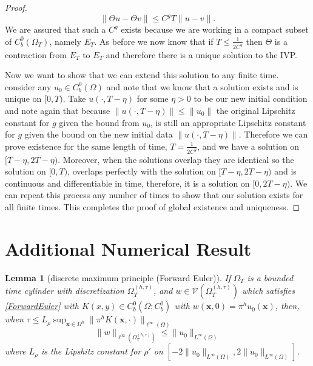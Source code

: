 \documentclass[aps,
preprint,
groupedaddress,
showkeys,
amsmath]{revtex4-2}
\newtheorem{lemma}{Lemma}
\begin{document}
\begin{proof}
       \[\|\Theta u-\Theta v\|\leq C^gT\|u-v\|.\] We are assured that such a $C^g$ exists because we are working in a compact subset of $C^0_b(\Omega_T)$, namely $E_T$.
        As before we now know that if $T\leq \frac{1}{2C^g}$ then $\Theta$ is a contraction from $E_{T}$ to $E_T$ and therefore there is a unique solution to the IVP.

        Now we want to show that we can extend this solution to any finite time. 
        consider any $u_0\in C^0_b(\Omega)$ and note that we know that a solution exists and is unique on $[0,T)$. Take $u(\cdot, T-\eta)$ for some $\eta>0$ to be our new initial condition and note again that because $\|u(\cdot, T-\eta)\|\leq \|u_0\|$ the original Lipschitz constant for $g$ given the bound from $u_0$, is still an appropriate Lipschitz constant for $g$ given the bound on the new initial data $\|u(\cdot,T-\eta)\|$. Therefore we can prove existence for the same length of time, $T=\frac{1}{2C^g}$, and we have a solution on $[T-\eta, 2T-\eta)$. Moreover, when the solutions overlap they are identical so the solution on $[0,T)$, overlaps perfectly with the solution on $[T-\eta, 2T-\eta)$ and is continuous and differentiable in time, therefore, it is a solution on $[0,2T-\eta)$. We can repeat this process any number of times to show that our solution exists for all finite times. This completes the proof of global existence and uniqueness. 
    \end{proof}

\section{Additional Numerical Result}\label{APP:AdditionalNumericalResults}
    \begin{lemma}[discrete maximum principle (Forward Euler)]\label{LEM:DiscreteMaximumPrinciple}
        If $\Omega_T$ is a bounded time cylinder with discretization $\Omega_T^{(h,\tau)}$, and $w\in \mathcal{V}(\Omega_T^{(h,\tau)})$ which satisfies \eqref{ForwardEuler} with $K(x,y)\in C^0_b(\Omega;C^0_b)$ with $w(\mathbf{x},0)=\pi^h u_0(\mathbf{x})$, then, when $\tau\leq L_\rho\sup_{\mathbf{x}\in \Omega^h}\|\pi^hK(\mathbf{x},\cdot)\|_{\ell^\infty(\Omega)}$ 
       \[\|w\|_{\ell^\infty\left({\Omega^{(h,\tau)}_T}\right)}\leq \|u_0\|_{L^\infty(\Omega)}\]
        where $L_\rho$ is the Lipshitz constant for $\rho'$ on $[-2\|u_0\|_{L^\infty(\Omega)},2\|u_0\|_{L^\infty(\Omega)}]$. 
    \end{lemma}
\end{document}
